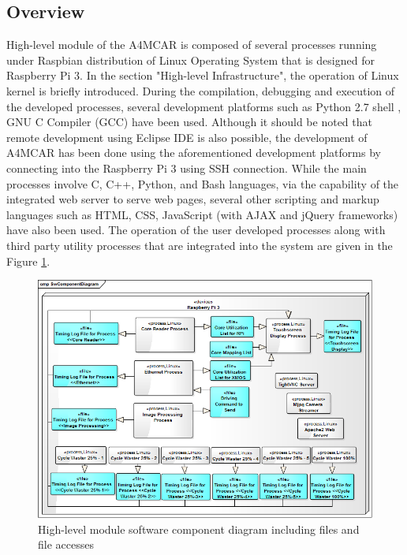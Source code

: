 \subsection{Overview}
High-level module of the A4MCAR is composed of several processes running under Raspbian \cite{raspbiandownload} distribution of Linux Operating System that is designed for Raspberry Pi 3. In the section "High-level Infrastructure", the operation of Linux kernel is briefly introduced. During the compilation, debugging and execution of the developed processes, several development platforms such as Python 2.7 shell \cite{python27}, GNU C Compiler (GCC) \cite{gcc} have been used. Although it should be noted that remote development using Eclipse IDE \cite{remotedebuggingeclipse} is also possible, the development of A4MCAR has been done using the aforementioned development platforms by connecting into the Raspberry Pi 3 using SSH connection. While the main processes involve C, C++, Python, and Bash \cite{bash} languages, via the capability of the integrated web server to serve web pages, several other scripting and markup languages such as HTML, CSS, JavaScript (with AJAX \cite{howajaxworks} and jQuery \cite{jquery} frameworks) have also been used. The operation of the user developed processes along with third party utility processes that are integrated into the system are given in the Figure \ref{fig:rpicomponents}. 
\begin{figure}[!ht]
	\includegraphics[scale=0.62]{content/images/rpicomponents.png}
	\caption{High-level module software component diagram including files and file accesses}
	\label{fig:rpicomponents}
\end{figure}

